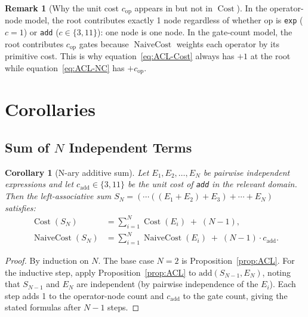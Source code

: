 \documentclass[12pt,a4paper]{article}
\newtheorem{corollary}[theorem]{Corollary}
\theoremstyle{definition}
\newtheorem{remark}[theorem]{Remark}
\newcommand{\Cost}{\operatorname{Cost}}
\newcommand{\NC}{\operatorname{NaiveCost}}
\begin{document}
\begin{remark}[Why the unit cost $c_{\mathrm{op}}$ appears in \NC{} but not in
$\Cost$]
\label{rem:why-c}
In the operator-node model, the root contributes exactly 1 node regardless of
whether $\mathrm{op}$ is \texttt{exp} ($c = 1$) or \texttt{add}
($c \in \{3, 11\}$): one node is one node.  In the gate-count model, the root
contributes $c_{\mathrm{op}}$ gates because $\NC$ weights each operator by its
primitive cost.  This is why equation~\eqref{eq:ACL-Cost} always has $+1$ at
the root while equation~\eqref{eq:ACL-NC} has $+c_{\mathrm{op}}$.
\end{remark}

\section{Corollaries}
\label{sec:corollaries}

\subsection{Sum of $N$ Independent Terms}

\begin{corollary}[N-ary additive sum]
\label{cor:Nary}
Let $E_1, E_2, \ldots, E_N$ be pairwise independent expressions and let
$c_{\mathrm{add}} \in \{3, 11\}$ be the unit cost of \textup{\texttt{add}} in
the relevant domain.  Then the left-associative sum
$S_N = (\cdots((E_1 + E_2) + E_3) + \cdots + E_N)$
satisfies:
\begin{align}
  \Cost(S_N)
    &= \sum_{i=1}^{N} \Cost(E_i) \;+\; (N-1),
  \label{eq:Nary-Cost} \\[4pt]
  \NC(S_N)
    &= \sum_{i=1}^{N} \NC(E_i) \;+\; (N-1)\cdot c_{\mathrm{add}}.
  \label{eq:Nary-NC}
\end{align}
\end{corollary}

\begin{proof}
By induction on $N$.  The base case $N = 2$ is Proposition~\ref{prop:ACL}.
For the inductive step, apply Proposition~\ref{prop:ACL} to
$\mathrm{add}(S_{N-1}, E_N)$, noting that $S_{N-1}$ and $E_N$ are independent
(by pairwise independence of the $E_i$).  Each step adds 1 to the
operator-node count and $c_{\mathrm{add}}$ to the gate count, giving the stated
formulas after $N-1$ steps.
\end{proof}
\end{document}
